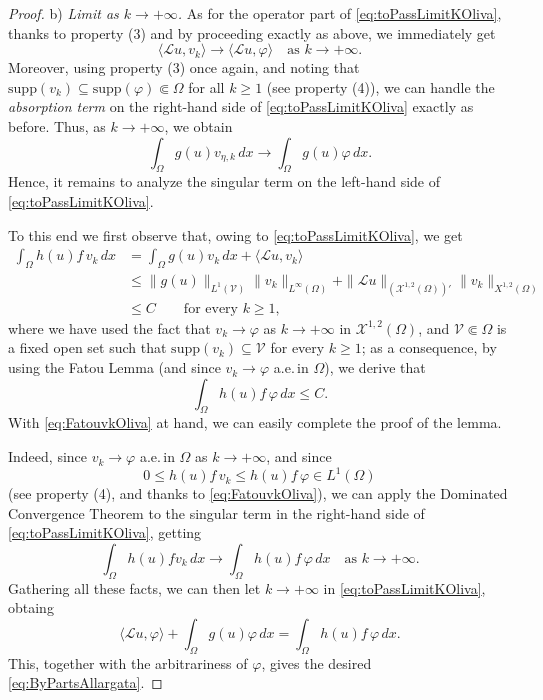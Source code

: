 \documentclass[11pt,a4paper]{amsart}
\def \LL {\mathcal{L}}
\theoremstyle{definition}
\theoremstyle{plain}
\numberwithin{equation}{section}
\begin{document}
{\begin{proof}
b)\,\,\emph{Limit as $k\to+\infty$.} As for the operator part
of \eqref{eq:toPassLimitKOliva}, thanks to property (3)
and by proceeding exactly as above, we immediately get
$$\langle \LL u,v_{k}\rangle\to \langle \LL u,\varphi\rangle\quad\text{as $k\to+\infty$}.$$ 
Moreover, using property (3) once again, and noting that $\mathrm{supp}(v_k) \subseteq \mathrm{supp}(\varphi) \Subset \Omega$ for all $k \geq 1$ (see property (4)), we can handle the 
\emph{absorption term} on the right-hand side of \eqref{eq:toPassLimitKOliva} exactly as before. Thus, as $k \to +\infty$, we obtain 
 $$\int_{\Omega}g(u)v_{\eta,k} \, dx\to \int_\Omega g(u)\varphi\,dx.$$
 Hence, it remains to analyze the singular term on the left-hand side of \eqref{eq:toPassLimitKOliva}.
 
 To this end we first observe that, owing to \eqref{eq:toPassLimitKOliva}, we get
 \begin{align*}
 	\int_{\Omega}h(u)f\,v_k\,dx & = \int_{\Omega}g(u)v_k\,dx
 	+\langle \LL u,v_{k}\rangle \\
 	& \leq \|g(u)\|_{L^1(\mathcal{V})}\|v_k\|_{L^\infty(\Omega)}
 	+ \|\mathcal{L}u\|_{(\mathcal{X}^{1,2}(\Omega))'}\|v_k\|_{X^{1,2}(\Omega)} 
 	\\
 	& \leq C\qquad\text{for every $k\geq 1$},
 \end{align*}
 where we have used the fact that $v_k\to \varphi$ as $k\to+\infty$ in
 $\mathcal{X}^{1,2}(\Omega)$, and $\mathcal{V}\Subset\Omega$ is a fixed open
 set such that $\mathrm{supp}(v_k)\subseteq\mathcal{V}$ for every $k\geq 1$;
 as a consequence, by using the Fatou Lemma 
 (and since $v_k\to\varphi$ a.e.\,in $\Omega$), we derive that
 \begin{equation} \label{eq:FatouvkOliva}
 	\int_{\Omega}h(u)f\,\varphi\,dx \leq C.
 \end{equation}
 With \eqref{eq:FatouvkOliva} at hand,  we can easily
 complete the proof of the lemma. 
 
 Indeed, since $v_k\to\varphi$ a.e.\,in $\Omega$ as $k\to+\infty$, and since 
 $$0\leq h(u)f\,v_k\leq h(u)f\,\varphi\in L^1(\Omega)$$
 (see property (4), and thanks to \eqref{eq:FatouvkOliva}), we can apply the Dominated Convergence Theorem to the singular term
 in the right-hand side of \eqref{eq:toPassLimitKOliva}, getting
 $$\int_{\Omega}h(u)f v_{k}\, dx\to\int_{\Omega}h(u)f\,\varphi\,dx\quad
 \text{as $k\to+\infty$}.$$
 Gathering all these facts, we can then let $k\to+\infty$ in
 \eqref{eq:toPassLimitKOliva}, obtaing
 $$\langle \mathcal{L}u,\varphi\rangle+\int_\Omega g(u)\varphi\,dx = 
 \int_{\Omega}h(u)f\,\varphi\,dx.
 $$
 This, together with the arbitrariness of $\varphi$, gives the desired \eqref{eq:ByPartsAllargata}.
 \end{proof}
  \medskip  
  
}
\end{document}
